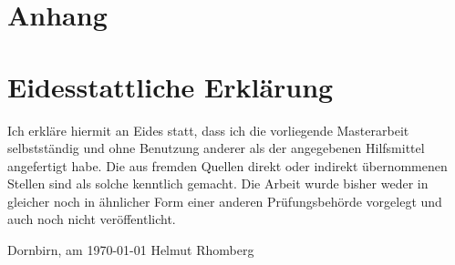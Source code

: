\documentclass[a4paper,12pt, twoside]{scrreprt}
\begin{document}
\appendix
\chapter{Anhang}  %


\clearpage
{}
{}
\printbibliography


\chapter*{Eidesstattliche Erklärung}
Ich erkläre hiermit an Eides statt, dass ich die vorliegende Masterarbeit selbstständig und ohne Benutzung anderer als der angegebenen Hilfsmittel angefertigt habe. Die aus fremden Quellen direkt oder indirekt übernommenen Stellen sind als solche kenntlich gemacht. Die Arbeit wurde bisher weder in gleicher noch in ähnlicher Form einer anderen Prüfungsbehörde vorgelegt und auch noch nicht veröffentlicht.

\vspace{3cm}
\noindent
Dornbirn, am \today %
\hfill Helmut Rhomberg %
\end{document}

